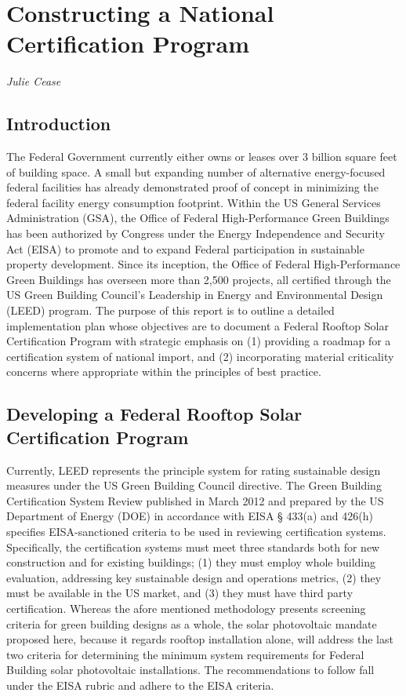 \section{Constructing a National Certification Program}

\emph{Julie Cease}

\subsection{Introduction}
The Federal Government currently either owns or leases over 3 billion square feet of building space. A small but expanding number of alternative energy-focused federal facilities has already demonstrated proof of concept in minimizing the federal facility energy consumption footprint. Within the US General Services Administration (GSA), the Office of Federal High-Performance Green Buildings has been authorized by Congress under the Energy Independence and Security Act (EISA) to promote and to expand Federal participation in sustainable property development. Since its inception, the Office of Federal High-Performance Green Buildings has overseen more than 2,500 projects, all certified through the US Green Building Council’s Leadership in Energy and Environmental Design (LEED) program. The purpose of this report is to outline a detailed implementation plan whose objectives are to document a Federal Rooftop Solar Certification Program with strategic emphasis on (1) providing a roadmap for a certification system of national import, and (2) incorporating material criticality concerns where appropriate within the principles of best practice.


\subsection{Developing a Federal Rooftop Solar Certification Program}
Currently, LEED represents the principle system for rating sustainable design measures under the US Green Building Council directive. The Green Building Certification System Review published in March 2012 and prepared by the US Department of Energy (DOE) in accordance with EISA § 433(a) and 426(h) specifies EISA-sanctioned criteria to be used in reviewing certification systems. Specifically, the certification systems must meet three standards both for new construction and for existing buildings; (1) they must employ whole building evaluation, addressing key sustainable design and operations metrics, (2) they must be available in the US market, and (3) they must have third party certification. Whereas the afore mentioned methodology presents screening criteria for green building designs as a whole, the solar photovoltaic mandate proposed here, because it regards rooftop installation alone, will address the last two criteria for determining the minimum system requirements for Federal Building solar photovoltaic installations. The recommendations to follow fall under the EISA rubric and adhere to the EISA criteria.


